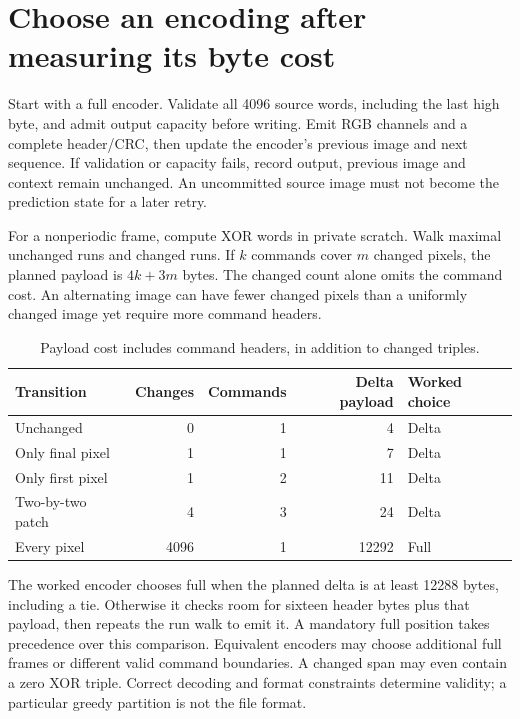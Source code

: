 \section{Choose an encoding after measuring its byte cost}

Start with a full encoder. Validate all 4096 source words, including the last
high byte, and admit output capacity before writing. Emit RGB channels and a
complete header/CRC, then update the encoder's previous image and next sequence.
If validation or capacity fails, record output, previous image and context
remain unchanged. An uncommitted source image must not become the prediction
state for a later retry.

For a nonperiodic frame, compute XOR words in private scratch. Walk maximal
unchanged runs and changed runs. If $k$ commands cover $m$ changed pixels,
the planned payload is $4k+3m$ bytes. The changed count alone omits the command
cost. An alternating image can have fewer changed pixels than a uniformly
changed image yet require more command headers.

\begin{table}[!ht]
  \centering
  \begin{tabular}{l r r r l}
    \toprule
    Transition       & Changes & Commands & Delta payload & Worked choice \\
    \midrule
    Unchanged        & 0       & 1        & 4             & Delta         \\
    Only final pixel & 1       & 1        & 7             & Delta         \\
    Only first pixel & 1       & 2        & 11            & Delta         \\
    Two-by-two patch & 4       & 3        & 24            & Delta         \\
    Every pixel      & 4096    & 1        & 12292         & Full          \\
    \bottomrule
  \end{tabular}
  \caption{Payload cost includes command headers, in addition to changed triples.}
\end{table}

The worked encoder chooses full when the planned delta is at least 12288 bytes,
including a tie. Otherwise it checks room for sixteen header bytes plus that
payload, then repeats the run walk to emit it. A mandatory full position takes
precedence over this comparison. Equivalent encoders may choose additional
full frames or different valid command boundaries. A changed span may even
contain a zero XOR triple. Correct decoding and format constraints determine
validity; a particular greedy partition is not the file format.

